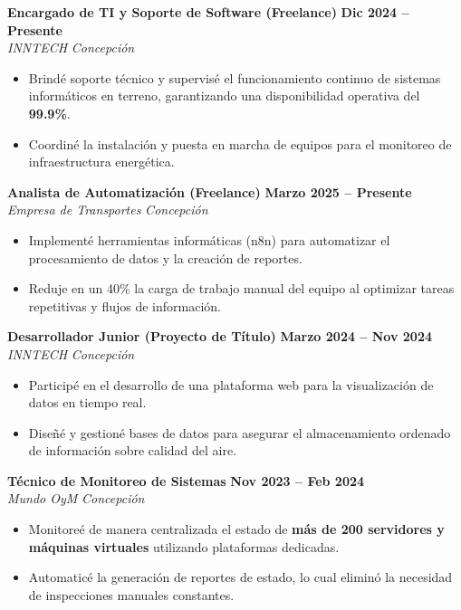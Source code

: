 \documentclass[a4paper,10pt]{article}
\begin{document}
\noindent \textbf{Encargado de TI y Soporte de Software (Freelance)} \hfill \textbf{Dic 2024 -- Presente} \\
\textit{INNTECH} \hfill \textit{Concepción}
\begin{itemize}[leftmargin=*, noitemsep, topsep=2pt]
    \item Brindé soporte técnico y supervisé el funcionamiento continuo de sistemas informáticos en terreno, garantizando una disponibilidad operativa del \textbf{99.9\%}.
    \item Coordiné la instalación y puesta en marcha de equipos para el monitoreo de infraestructura energética.
\end{itemize}

\vspace{0.2cm}

\noindent \textbf{Analista de Automatización (Freelance)} \hfill \textbf{Marzo 2025 -- Presente} \\
\textit{Empresa de Transportes} \hfill \textit{Concepción}
\begin{itemize}[leftmargin=*, noitemsep, topsep=2pt]
    \item Implementé herramientas informáticas (n8n) para automatizar el procesamiento de datos y la creación de reportes.
    \item Reduje en un 40\% la carga de trabajo manual del equipo al optimizar tareas repetitivas y flujos de información.
\end{itemize}

\vspace{0.2cm}

\noindent \textbf{Desarrollador Junior (Proyecto de Título)} \hfill \textbf{Marzo 2024 -- Nov 2024} \\
\textit{INNTECH} \hfill \textit{Concepción}
\begin{itemize}[leftmargin=*, noitemsep, topsep=2pt]
    \item Participé en el desarrollo de una plataforma web para la visualización de datos en tiempo real.
    \item Diseñé y gestioné bases de datos para asegurar el almacenamiento ordenado de información sobre calidad del aire.
\end{itemize}

\vspace{0.2cm}

\noindent \textbf{Técnico de Monitoreo de Sistemas} \hfill \textbf{Nov 2023 -- Feb 2024} \\
\textit{Mundo OyM} \hfill \textit{Concepción}
\begin{itemize}[leftmargin=*, noitemsep, topsep=2pt]
    \item Monitoreé de manera centralizada el estado de \textbf{más de 200 servidores y máquinas virtuales} utilizando plataformas dedicadas.
    \item Automaticé la generación de reportes de estado, lo cual eliminó la necesidad de inspecciones manuales constantes.
\end{itemize}
\end{document}
